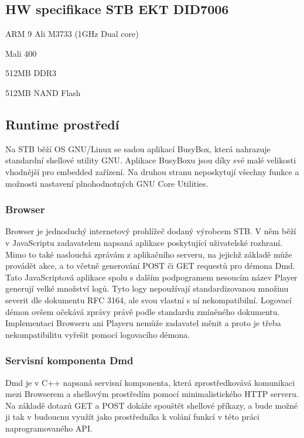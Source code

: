 \documentclass[thesis=B,czech]{FITthesis}[2012/06/26]
\begin{document}
\subsection{HW specifikace STB EKT DID7006}
\begin{description}
\setlength\itemsep{-1ex}
  \item [CPU:] ARM 9 Ali M3733 (1GHz Dual core)
  \item [GPU:] Mali 400
  \item [RAM:] 512MB DDR3
  \item [Perzistentní paměť:] 512MB NAND Flash
\end{description}

\subsection{Runtime prostředí}
Na STB běží OS GNU/Linux se sadou aplikací BusyBox, která nahrazuje standardní shellové utility GNU. Aplikace BusyBoxu jsou díky své malé velikosti vhodnější pro embedded zařízení. Na druhou stranu neposkytují všechny funkce a možnosti nastavení plnohodnotných GNU Core Utilities.

\subsubsection{Browser}
Browser je jednoduchý internetový prohlížeč dodaný výrobcem STB.
V něm běží v JavaScriptu zadavatelem napsaná aplikace poskytující uživatelské rozhraní. Mimo to také naslouchá zprávám z aplikačního serveru, na jejichž základě může provádět akce, a to včetně generování POST či GET requestů pro démona Dmd.
Tato JavaScriptová aplikace spolu s dalším podpogramem nesoucím název Player generují velké množství logů. Tyto logy nepoužívají standardizovanou množinu severit dle dokumentu RFC 3164, ale svou vlastní s ní nekompatibilní. Logovací démon ovšem očekává zprávy právě podle standardu zmíněného dokumentu. Implementaci Browseru ani Playeru nemůže zadavatel měnit a proto je třeba nekompatibilitu vyřešit pomocí logovacího démona.

\subsubsection{Servisní komponenta Dmd}
Dmd je v C++ napsaná servisní komponenta, která zprostředkovává komunikaci mezi Browserem a shellovým prostředím pomocí minimalistického HTTP serveru.
Na základě dotazů GET a POST dokáže spouštět shellové příkazy, a bude možné ji tak v budoucnu využít jako prostředníka k volání funkcí v této práci naprogramovaného API.
\end{document}
